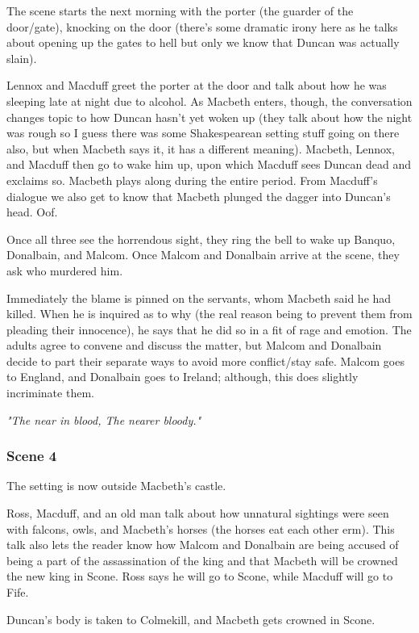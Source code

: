 The scene starts the next morning with the porter (the guarder of the door/gate), knocking on the door (there's some dramatic irony here as he talks about opening up the gates to hell but only we know that Duncan was actually slain).

Lennox and Macduff greet the porter at the door and talk about how he was
sleeping late at night due to alcohol. As Macbeth enters, though, the
conversation changes topic to how Duncan hasn't yet woken up (they talk about
how the night was rough so I guess there was some Shakespearean setting stuff
going on there also, but when Macbeth says it, it has a different meaning).
Macbeth, Lennox, and Macduff then go to wake him up, upon which Macduff sees
Duncan dead and exclaims so. Macbeth plays along during the entire period. From Macduff's dialogue we also get to know that Macbeth plunged the dagger into Duncan's head. Oof.

Once all three see the horrendous sight, they ring the bell to wake up Banquo,
Donalbain, and Malcom. Once Malcom and Donalbain arrive at the scene, they ask
who murdered him.

Immediately the blame is pinned on the servants, whom Macbeth said he had
killed. When he is inquired as to why (the real reason being to prevent them
from pleading their innocence), he says that he did so in a fit of rage and
emotion. The adults agree to convene and discuss the matter, but Malcom and
Donalbain decide to part their separate ways to avoid more conflict/stay safe.
Malcom goes to England, and Donalbain goes to Ireland; although, this does
slightly incriminate them.

\textit{"The near in blood, The nearer bloody."}

\subsubsection{Scene 4}

The setting is now outside Macbeth's castle.

Ross, Macduff, and an old man talk about how unnatural sightings were seen with
falcons, owls, and Macbeth's horses (the horses eat each other erm). This talk
also lets the reader know how Malcom and Donalbain are being accused of being a
part of the assassination of the king and that Macbeth will be crowned the new
king in Scone. Ross says he will go to Scone, while Macduff will go to Fife.

Duncan's body is taken to Colmekill, and Macbeth gets crowned in Scone.
